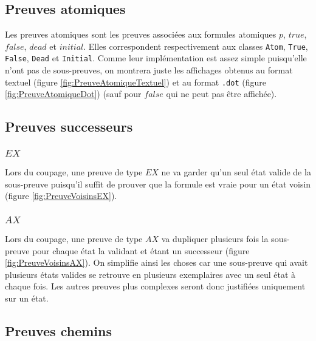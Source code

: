 \documentclass[dvipsnames]{report}
\begin{document}


\subsection{Preuves atomiques}

Les preuves atomiques sont les preuves associées aux formules atomiques $p$, $true$, $false$, $dead$ et $initial$. Elles correspondent respectivement aux classes \texttt{Atom}, \texttt{True}, \texttt{False}, \texttt{Dead} et \texttt{Initial}. Comme leur implémentation est assez simple puisqu'elle n'ont pas de sous-preuves, on montrera juste les affichages obtenus au format textuel (figure \ref{fig:PreuveAtomiqueTextuel}) et au format \texttt{.dot} (figure \ref{fig:PreuveAtomiqueDot}) (sauf pour $false$ qui ne peut pas être affichée).





\subsection{Preuves successeurs}

\subsubsection{$EX$}

Lors du coupage, une preuve de type $EX$ ne va garder qu'un seul état valide de la sous-preuve puisqu'il suffit de prouver que la formule est vraie pour un état voisin (figure \ref{fig:PreuveVoisinsEX}).



\subsubsection{$AX$}

Lors du coupage, une preuve de type $AX$ va dupliquer plusieurs fois la sous-preuve pour chaque état la validant et étant un successeur (figure \ref{fig:PreuveVoisinsAX}). On simplifie ainsi les choses car une sous-preuve qui avait plusieurs états valides se retrouve en plusieurs exemplaires avec un seul état à chaque fois. Les autres preuves plus complexes seront donc justifiées uniquement sur un état.



\subsection{Preuves chemins}
\end{document}
